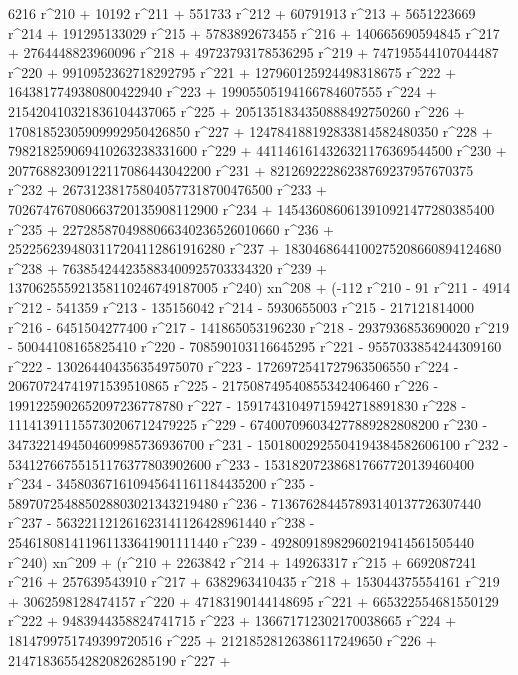        6216 r^210 + 10192 r^211 + 551733 r^212 + 60791913 r^213 + 
       5651223669 r^214 + 191295133029 r^215 + 5783892673455 r^216 + 
       140665690594845 r^217 + 2764448823960096 r^218 + 
       49723793178536295 r^219 + 747195544107044487 r^220 + 
       9910952362718292795 r^221 + 127960125924498318675 r^222 + 
       1643817749380800422940 r^223 + 19905505194166784607555 r^224 + 
       215420410321836104437065 r^225 + 
       2051351834350888492750260 r^226 + 
       17081852305909992950426850 r^227 + 
       124784188192833814582480350 r^228 + 
       798218259069410263238331600 r^229 + 
       4411461614326321176369544500 r^230 + 
       20776882309122117086443042200 r^231 + 
       82126922286238769237957670375 r^232 + 
       267312381758040577318700476500 r^233 + 
       702674767080663720135908112900 r^234 + 
       1454360860613910921477280385400 r^235 + 
       2272858704988066340236526010660 r^236 + 
       2522562394803117204112861916280 r^237 + 
       1830468644100275208660894124680 r^238 + 
       763854244235883400925703334320 r^239 + 
       137062555921358110246749187005 r^240) xn^208 + (-112 r^210 - 
       91 r^211 - 4914 r^212 - 541359 r^213 - 135156042 r^214 - 
       5930655003 r^215 - 217121814000 r^216 - 6451504277400 r^217 - 
       141865053196230 r^218 - 2937936853690020 r^219 - 
       50044108165825410 r^220 - 708590103116645295 r^221 - 
       9557033854244309160 r^222 - 130264404356354975070 r^223 - 
       1726972541727963506550 r^224 - 20670724741971539510865 r^225 - 
       217508749540855342406460 r^226 - 
       1991225902652097236778780 r^227 - 
       15917431049715942718891830 r^228 - 
       111413911155730206712479225 r^229 - 
       674007096034277889282808200 r^230 - 
       3473221494504609985736936700 r^231 - 
       15018002925504194384582606100 r^232 - 
       53412766755151176377803902600 r^233 - 
       153182072386817667720139460400 r^234 - 
       345803671610945641161184435200 r^235 - 
       589707254885028803021343219480 r^236 - 
       713676284457893140137726307440 r^237 - 
       563221121261623141126428961440 r^238 - 
       254618081411961133641901111440 r^239 - 
       49280918982960219414561505440 r^240) xn^209 + (r^210 + 
       2263842 r^214 + 149263317 r^215 + 6692087241 r^216 + 
       257639543910 r^217 + 6382963410435 r^218 + 
       153044375554161 r^219 + 3062598128474157 r^220 + 
       47183190144148695 r^221 + 665322554681550129 r^222 + 
       9483944358824741715 r^223 + 136671712302170038665 r^224 + 
       1814799751749399720516 r^225 + 21218528126386117249650 r^226 + 
       214718365542820826285190 r^227 + 
